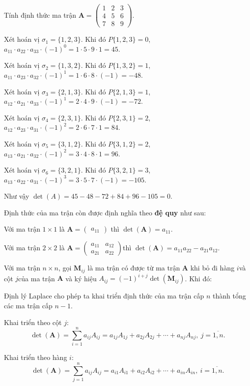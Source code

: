 \begin{example}
    Tính định thức ma trận $\bm{A}=\begin{pmatrix}1 & 2 & 3 \\ 4 & 5 & 6 \\ 7 & 8 & 9\end{pmatrix}$​.

    Xét hoán vị $\sigma_1 = \{1, 2, 3\}$​. Khi đó $P\{1, 2, 3\}=0$​, $a_{11} \cdot a_{22} \cdot a_{33} \cdot (-1)^0 = 1 \cdot 5 \cdot 9 \cdot 1 = 45$​.

    Xét hoán vị $\sigma_2 = \{1, 3, 2\}$​. Khi đó $P\{1, 3, 2\} = 1$​, $a_{11} \cdot a_{23} \cdot a_{32} \cdot (-1)^1 = 1 \cdot 6 \cdot 8 \cdot (-1) = -48$.

    Xét hoán vị $\sigma_3 = \{2, 1, 3\}$​. Khi đó $P\{2,1,3\}=1$​, $a_{12} \cdot a_{21} \cdot a_{33} \cdot (-1)^1 = 2 \cdot 4 \cdot 9 \cdot (-1) = -72$.

    Xét hoán vị $\sigma_4=\{2,3,1\}$. Khi đó $P\{2, 3, 1\} = 2$​, $a_{12} \cdot a_{23} \cdot a_{31} \cdot (-1)^2 = 2 \cdot 6 \cdot 7 \cdot 1 = 84$​.

    Xét hoán vị $\sigma_5=\{3, 1, 2\}$. Khi đó $P\{3, 1, 2\} = 2$​, $a_{13} \cdot a_{21} \cdot a_{32} \cdot (-1)^2 = 3 \cdot 4 \cdot 8 \cdot 1 = 96$​.

    Xét hoán vị $\sigma_6=\{3, 2, 1\}$​. Khi đó $P\{3, 2, 1\}=3$​, $a_{13} \cdot a_{22} \cdot a_{31} \cdot (-1)^3 = 3 \cdot 5 \cdot 7 \cdot  (-1) = -105$​.

    Như vậy $\det(A)=45-48-72+84+96-105=0$​.
\end{example}

Định thức của ma trận còn được định nghĩa theo \textbf{đệ quy} như sau:

Với ma trận $1 \times 1$ là $\bm{A}=\begin{pmatrix}a_{11}\end{pmatrix}$ thì $\det(\bm{A})=a_{11}$.

Với ma trận $2 \times 2$ là $\bm{A} = \begin{pmatrix}a_{11} & a_{12} \\ a_{21} & a_{22}\end{pmatrix}$​ thì $\det(\bm{A})=a_{11}a_{22} - a_{21}a_{12}$.

Với ma trận $n \times n$, gọi $\bm{M}_{ij}$ là ma trận có được từ ma trận $\bm{A}$ khi bỏ đi hàng $i$​ và cột $j$​ của ma trận $\bm{A}$ và ký hiệu $A_{ij}=(-1)^{i+j} \det (\bm{M}_{ij})$. Khi đó:

\begin{theorem}
    Định lý Laplace cho phép ta khai triển định thức của ma trận cấp $n$ thành tổng các ma trận cấp $n-1$.

    Khai triển theo cột $j$​: \[ \det(\bm{A})=\displaystyle{\sum_{i=1}^na_{ij} A_{ij}} = a_{1j} A_{1j} + a_{2j} A_{2j} + \cdots + a_{nj} A_{nj},\ j = \overline{1, n}.\]

    Khai triển theo hàng $i$​: \[ \det(\bm{A})=\displaystyle{\sum_{j=1}^n a_{ij} A_{ij}} = a_{i1} A_{i1} + a_{i2} A_{i2} + \cdots + a_{in} A_{in},\ i = \overline{1, n}. \]​
\end{theorem}

